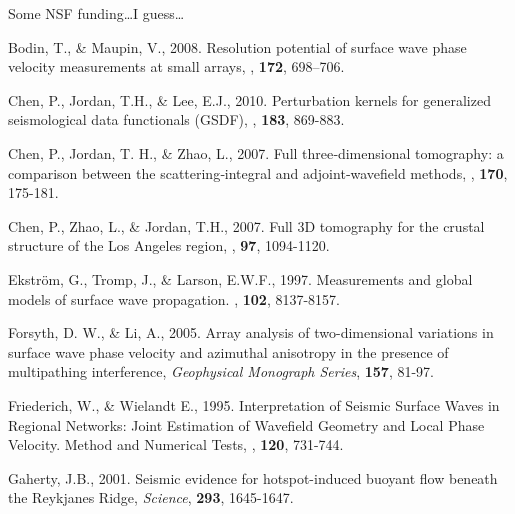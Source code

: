 \documentclass{gji}
\begin{document}
\begin{acknowledgments}
	Some NSF funding\ldots I guess\ldots
\end{acknowledgments}

\begin{thebibliography}{}

	   Bodin, T., \& Maupin, V., 2008. Resolution potential of surface wave phase velocity measurements at small arrays, \textit{\gji}, \textbf{172}, 698–706.

	   Chen, P., Jordan, T.H., \& Lee, E.J., 2010. Perturbation kernels for generalized seismological data functionals (GSDF), \textit{\gji}, \textbf{183}, 869-883.

	   Chen, P., Jordan, T. H., \& Zhao, L., 2007. Full three‐dimensional tomography: a comparison between the scattering‐integral and adjoint‐wavefield methods, \textit{\gji}, \textbf{170}, 175-181.

	   Chen, P., Zhao, L., \& Jordan, T.H., 2007. Full 3D tomography for the crustal structure of the Los Angeles region, \textit{\bssa}, \textbf{97}, 1094-1120.

	   Ekstr\"{o}m, G., Tromp, J., \& Larson, E.W.F., 1997. Measurements and global models of surface wave propagation. \textit{\jgr}, \textbf{102}, 8137-8157. 

	   Forsyth, D. W., \& Li, A., 2005. Array analysis of two-dimensional variations in surface wave phase velocity and azimuthal anisotropy in the presence of multipathing interference, \textit{Geophysical Monograph Series}, \textbf{157}, 81-97.

   Friederich, W., \& Wielandt E., 1995. Interpretation of Seismic Surface Waves in Regional Networks: Joint Estimation of Wavefield Geometry and Local Phase Velocity. Method and Numerical Tests, \textit{\gjras}, \textbf{120}, 731-744.

	   Gaherty, J.B., 2001. Seismic evidence for hotspot-induced buoyant flow beneath the Reykjanes Ridge, \textit{Science}, \textbf{293}, 1645-1647.


\end{thebibliography}
\end{document}
